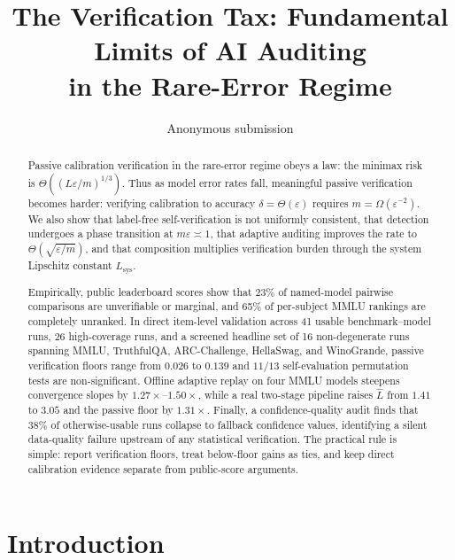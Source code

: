 \documentclass{article}
\title{The Verification Tax: Fundamental Limits of AI Auditing \\ in the Rare-Error Regime}
\author{Anonymous submission}
\newcommand{\Lip}{L}
\newcommand{\errrate}{\varepsilon}
\newcommand{\nsamples}{m}
\newcommand{\targetacc}{\delta}
\newcommand{\Lsystem}{L_{\mathrm{sys}}}
\theoremstyle{definition}
\begin{document}
\maketitle

\begin{abstract}
Passive calibration verification in the rare-error regime obeys a law: the minimax risk is $\Theta((\Lip\errrate/\nsamples)^{1/3})$. Thus as model error rates fall, meaningful passive verification becomes harder: verifying calibration to accuracy $\targetacc = \Theta(\errrate)$ requires $\nsamples = \Omega(\errrate^{-2})$. We also show that label-free self-verification is not uniformly consistent, that detection undergoes a phase transition at $\nsamples \errrate \asymp 1$, that adaptive auditing improves the rate to $\Theta(\sqrt{\errrate/\nsamples})$, and that composition multiplies verification burden through the system Lipschitz constant $\Lsystem$.

Empirically, public leaderboard scores show that 23\% of named-model pairwise comparisons are unverifiable or marginal, and 65\% of per-subject MMLU rankings are completely unranked. In direct item-level validation across 41 usable benchmark--model runs, 26 high-coverage runs, and a screened headline set of 16 non-degenerate runs spanning MMLU, TruthfulQA, ARC-Challenge, HellaSwag, and WinoGrande, passive verification floors range from $0.026$ to $0.139$ and $11/13$ self-evaluation permutation tests are non-significant. Offline adaptive replay on four MMLU models steepens convergence slopes by $1.27\times$--$1.50\times$, while a real two-stage pipeline raises $\hat{L}$ from $1.41$ to $3.05$ and the passive floor by $1.31\times$. Finally, a confidence-quality audit finds that 38\% of otherwise-usable runs collapse to fallback confidence values, identifying a silent data-quality failure upstream of any statistical verification. The practical rule is simple: report verification floors, treat below-floor gains as ties, and keep direct calibration evidence separate from public-score arguments.
\end{abstract}

\section{Introduction}
\label{sec:intro}
\end{document}
